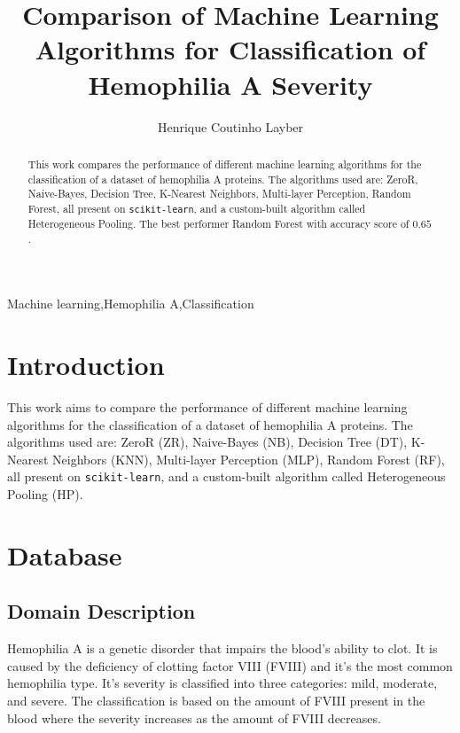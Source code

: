 \documentclass[review]{elsarticle}
\let\mono\texttt%
\begin{document}
\begin{frontmatter}

\title{Comparison of Machine Learning Algorithms for Classification of Hemophilia A Severity}

\author{Henrique Coutinho Layber}
\address{Vitória, Espírito Santo, Brazil}

\begin{abstract}
This work compares the performance of different machine learning algorithms for the classification of a dataset of hemophilia A proteins. The algorithms used are: ZeroR, Naive-Bayes, Decision Tree, K-Nearest Neighbors, Multi-layer Perception, Random Forest, all present on \mono{scikit-learn}, and a custom-built algorithm called Heterogeneous Pooling. The best performer Random Forest with accuracy score of $0.65$.
\end{abstract}

\begin{keyword}
Machine learning\sep Hemophilia A\sep Classification
\end{keyword}

\end{frontmatter}

\linenumbers

\section{Introduction}

This work aims to compare the performance of different machine learning algorithms for the classification of a dataset of hemophilia A proteins. The algorithms used are: ZeroR (ZR), Naive-Bayes (NB), Decision Tree (DT), K-Nearest Neighbors (KNN), Multi-layer Perception (MLP), Random Forest (RF), all present on \mono{scikit-learn}, and a custom-built algorithm called Heterogeneous Pooling (HP).

\section{Database}

\subsection{Domain Description}

Hemophilia A is a genetic disorder that impairs the blood's ability to clot. It is caused by the deficiency of clotting factor VIII (FVIII) and it's the most common hemophilia type. 
It's severity is classified into three categories: mild, moderate, and severe. The classification is based on the amount of FVIII present in the blood where the severity increases as the amount of FVIII decreases.
\end{document}
